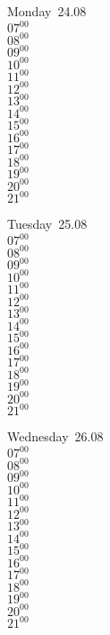 \documentclass[11pt,a4paper]{book}\usepackage[]{graphicx}\usepackage[]{color}
\begin{document}
\begin{headerbox}
\end{headerbox}
\begin{weekdaybox}
  Monday~24.08\\
  { 
  \vfill
  $07^{00}$\\
$08^{00}$\\
$09^{00}$\\
$10^{00}$\\
$11^{00}$\\
$12^{00}$\\
$13^{00}$\\
$14^{00}$\\
$15^{00}$\\
$16^{00}$\\
$17^{00}$\\
$18^{00}$\\
$19^{00}$\\
$20^{00}$\\
$21^{00}$\\
  }
\end{weekdaybox}
\begin{weekdaybox}
  Tuesday~25.08\\
  { 
  \vfill
  $07^{00}$\\
$08^{00}$\\
$09^{00}$\\
$10^{00}$\\
$11^{00}$\\
$12^{00}$\\
$13^{00}$\\
$14^{00}$\\
$15^{00}$\\
$16^{00}$\\
$17^{00}$\\
$18^{00}$\\
$19^{00}$\\
$20^{00}$\\
$21^{00}$\\
  }
\end{weekdaybox}
\begin{weekdaybox}
  Wednesday~26.08\\
  { 
  \vfill
  $07^{00}$\\
$08^{00}$\\
$09^{00}$\\
$10^{00}$\\
$11^{00}$\\
$12^{00}$\\
$13^{00}$\\
$14^{00}$\\
$15^{00}$\\
$16^{00}$\\
$17^{00}$\\
$18^{00}$\\
$19^{00}$\\
$20^{00}$\\
$21^{00}$\\
  }
\end{weekdaybox}
\end{document}
